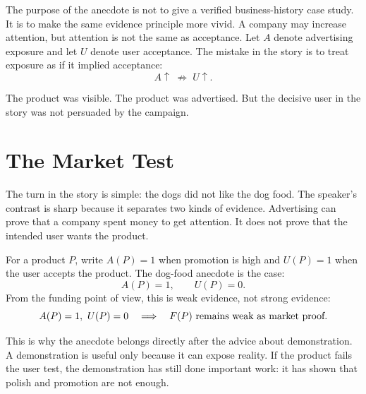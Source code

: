 The purpose of the anecdote is not to give a verified business-history case study. It is to make the same evidence principle more vivid. A company may increase attention, but attention is not the same as acceptance. Let \(A\) denote advertising exposure and let \(U\) denote user acceptance. The mistake in the story is to treat exposure as if it implied acceptance:
\begin{equation}
A \uparrow \;\not\Rightarrow\; U \uparrow .
\end{equation}

The product was visible. The product was advertised. But the decisive user in the story was not persuaded by the campaign.

\section{The Market Test}

The turn in the story is simple: the dogs did not like the dog food. The speaker's contrast is sharp because it separates two kinds of evidence. Advertising can prove that a company spent money to get attention. It does not prove that the intended user wants the product.

For a product \(P\), write \(A(P)=1\) when promotion is high and \(U(P)=1\) when the user accepts the product. The dog-food anecdote is the case:
\begin{equation}
A(P)=1,\qquad U(P)=0 .
\end{equation}
From the funding point of view, this is weak evidence, not strong evidence:
\begin{equation}
A(P)=1,\ U(P)=0
\quad\Longrightarrow\quad
F(P)\ \hbox{remains weak as market proof.}
\end{equation}

This is why the anecdote belongs directly after the advice about demonstration. A demonstration is useful only because it can expose reality. If the product fails the user test, the demonstration has still done important work: it has shown that polish and promotion are not enough.

